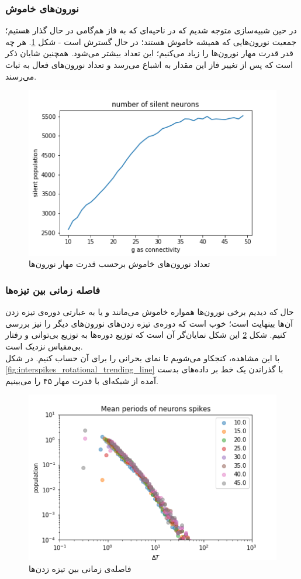 \documentclass[12pt,onecolumn,a4paper]{article}
\begin{document}
\subsubsection{نورون‌های خاموش}
در حین شبیه‌سازی متوجه شدیم که در ناحیه‌ای که به فاز هم‌گامی در حال گذار هستیم؛ جمعیت نورون‌هایی که همیشه خاموش هستند؛ در حال گسترش است - شکل \ref{fig:silent_neurons_rotational}. هر چه قدر قدرت مهار نورون‌ها را زیاد می‌کنیم؛ این تعداد بیشتر می‌شود. همچنین شایان ذکر است که پس از تغییر فاز این مقدار به اشباع می‌رسد و تعداد نورون‌های فعال به ثبات می‌رسند.
\begin{figure}[h]
\centering
  \includegraphics[width = 10 cm]{figs/Rotational/silent_neurons.png}
 \caption{تعداد نورون‌های خاموش برحسب قدرت مهار نورون‌ها}
  \label{fig:silent_neurons_rotational}
\end{figure}

\subsubsection{فاصله زمانی بین تیزه‌ها}
حال که دیدیم برخی نورون‌ها همواره خاموش می‌مانند و یا به عبارتی دوره‌ی تیزه زدن آن‌ها بینهایت است؛ خوب است که دوره‌ی تیزه زدن‌های نورون‌های دیگر را نیز بررسی کنیم. شکل \ref{fig:interspikes_rotational} این شکل نمایان‌گر آن است که توزیع دوره‌ها به توزیع بی‌توانی و رفتار بی‌مقیاس نزدیک است.\\
با این مشاهده، کنجکاو می‌شویم تا نمای بحرانی را برای آن حساب کنیم. در شکل \ref{fig:interspikes_rotational_trending_line} با گذراندن یک خط بر داده‌های بدست آمده از شبکه‌ای با قدرت مهار ۴۵ را می‌بینیم.

\begin{figure}[h]
\centering
  \includegraphics[width = 10 cm]{figs/Rotational/mean_spiking_periods.png}
 \caption{فاصله‌ی زمانی بین تیزه زدن‌ها}
  \label{fig:interspikes_rotational}
\end{figure}
\end{document}
